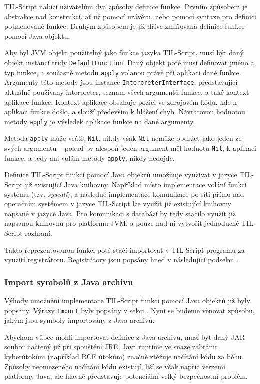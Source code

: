 TIL-Script nabízí uživatelům dva způsoby definice funkce. Prvním způsobem je abstrakce
nad konstrukcí, ať už pomocí uzávěru, nebo pomocí syntaxe pro definici pojmenované funkce. Druhým
způsobem je již dříve zmiňovaná definice funkce pomocí Java objektu.

Aby byl JVM objekt použitelný jako funkce jazyka TIL-Script, musí být daný objekt instancí třídy
\lstinline{DefaultFunction}. Daný objekt poté musí definovat jméno a typ funkce, a současně metodu
\lstinline{apply} volanou právě při aplikaci dané funkce. Argumenty této metody jsou instance
\lstinline{InterpreterInterface}, představující aktuálně používaný interpreter, seznam všech
argumentů funkce, a také kontext aplikace funkce. Kontext aplikace obsahuje pozici ve zdrojovém
kódu, kde k aplikaci funkce došlo, a slouží především k hlášení chyb. Návratovou hodnotou metody
\lstinline{apply} je výsledek aplikace funkce na dané argumenty.

Metoda \lstinline{apply} může vrátit \lstinline{Nil}, nikdy však \lstinline{Nil} nemůže obdržet
jako jeden ze svých argumentů -- pokud by alespoň jeden argument měl hodnotu \lstinline{Nil},
k aplikaci funkce, a tedy ani volání metody \lstinline{apply}, nikdy nedojde.

Definice TIL-Script funkcí pomocí Java objektů umožňuje využívat v jazyce TIL-Script již existující
Java knihovny. Například místo implementace volání funkcí systému (tzv. \textit{syscall}),
a následné implementace komunikace po síti přímo nad operačním systémem v jazyce TIL-Script lze
využít již existující knihovny napsané v jazyce Java. Pro komunikaci s databází by tedy stačilo
využít již napsanou knihovnu pro platformu JVM, a pouze nad ní vytvořit jednoduché TIL-Script
rozhraní.

Takto reprezentovanou funkci poté stačí importovat v TIL-Script programu za využití registrátoru.
Registrátory jsou popsány hned v následující podsekci .

\subsubsection{Import symbolů z Java archivu}\label{java-import}

Výhody umožnění implementace TIL-Script funkcí pomocí Java objektů již byly popsány. Výrazy
\lstinline{Import} byly popsány v sekci . Nyní se budeme věnovat způsobu,
jakým jsou symboly importovány z Java archivů.

Abychom vůbec mohli importovat definice z Java archivů, musí být daný JAR soubor načtený již při
spouštění JRE. Java runtime ve snaze zabránit kyberútokům (například RCE útokům) značně ztěžuje
načítání kódu za běhu. Způsoby neomezeného načítání kódu existují, liší se však napříč verzemi
platformy Java, ale hlavně představuje potenciální velký bezpečnostní problém.

